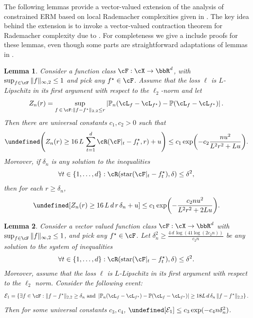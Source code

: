 \documentclass[11pt]{article} %
\theoremstyle{theorem}  %
\newtheorem{lemma}{Lemma}
\theoremstyle{plain}
\DeclarePairedDelimiter{\prn}{(}{)}
\let\Pr\undefined
\DeclareMathOperator{\Pr}{Pr}
\newcommand{\R}{\bbR}
\newcommand{\Pn}{\ensuremath{\mathbb{P}}}
\newcommand{\sh}{\ensuremath{\mathrm{star}}}
\newcommand{\rbar}{|}
\begin{document}
The following lemmas provide a vector-valued extension of the
analysis of constrained ERM based on local Rademacher complexities
given in \cite{wainwright2019}. The key idea behind the extension is to invoke a vector-valued contraction theorem for
Rademacher complexity due to \cite{maurer2016vector}. For completeness
we give a include proofs for these lemmas, even though some parts are straightforward adaptations of lemmas in \cite{wainwright2019}.
\begin{lemma}\label{lem:prob_localized} Consider a function class $\cF: \cX\rightarrow \R^d$, with $\sup_{f\in \cF} \|f\|_{\infty,2}\leq 1$ and pick any $f^{\star}\in \cF$.
Assume that the loss $\ell$ is $L$-Lipschitz in its first argument with respect to the $\ell_2$-norm and let
\begin{equation}
Z_n(r) = \sup_{f\, \in\, \cF: \|f-f^{\star}\|_{2,2}\leq r} \left| \Pn_n (\cL_{f} - \cL_{f^{\star}}) - \Pn (\cL_{f} - \cL_{f^{\star}}) \right|.
\end{equation}
Then there are universal constants $c_1, c_2>0$ such that
\begin{equation}
\label{eq:talagrand1}
\Pr\prn*{Z_n(r)\geq 16\, L\, \sum_{t=1}^d \cR(\cF\rbar_t-f_t^{\star},r) + u} \leq c_1 \exp\prn*{-c_2\frac{n u^2}{L^2 r^2 + L u}}.
\end{equation}
Moreover, if $\delta_{n}$ is any solution to the inequalities
\begin{equation}
\forall t\in \{1,\ldots, d\}: \cR(\sh(\cF\rbar_t - f_t^{\star}),\delta) \leq \delta^2,
\end{equation}
then for each $r\geq \delta_n$,
\begin{equation}
\Pr[Z_n(r)\geq 16\, L\, d\, r\, \delta_n + u] \leq c_1 \exp\prn*{-\frac{c_2 n u^2}{L^2 r^2 + 2 L u}}.
\end{equation}
\end{lemma}

\begin{lemma}\label{lem:peeling} Consider a vector valued function
  class $\cF: \cX\rightarrow \R^d$ with $\sup_{f\in \cF}
  \|f\|_{\infty,2}\leq 1$, and pick any $f^{\star}\in \cF$. Let
  $\delta_n^2\geq \frac{4\,d\,\log(41\log(2c_2 n))}{c_2 n}$  be any
  solution to the system of inequalities
\begin{equation}
\forall t\in \{1,\ldots, d\}: \cR(\sh(\cF\rbar_t - f_t^{\star}),\delta) \leq \delta^2.
\end{equation}
Moreover, assume that the loss $\ell$ is $L$-Lipschitz in its first argument with respect to the $\ell_2$ norm. Consider the following event:
\begin{equation}
{\cal E}_1 = \left\{\exists f \in \cF: \|f - f^{\star} \|_{2,2} \geq
  \delta_n \text{ and } \left| \Pn_n (\cL_{f} - \cL_{f^{\star}}) - \Pn
    (\cL_{f} - \cL_{f^{\star}}) \right| \geq 18 L\,d\, \delta_n\, \|f -
  f^{\star}\|_{2,2}\right\}.
\end{equation}
Then for some universal constants $c_3, c_4$, $\Pr[{\cal E}_1] \leq c_3 \exp\prn{-c_4 n \delta_n^2}$.
\end{lemma}
\end{document}

